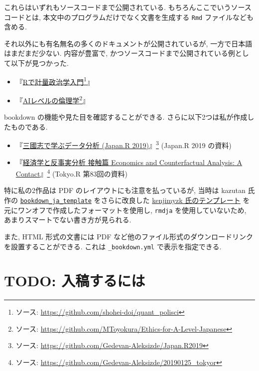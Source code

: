 \documentclass[
  nomag]{bxjsbook}
\providecommand{\tightlist}{%
  \setlength{\itemsep}{0pt}\setlength{\parskip}{0pt}}
\theoremstyle{definition}
\theoremstyle{definition}
\theoremstyle{definition}
\theoremstyle{remark}
\begin{document}
これらはいずれもソースコードまで公開されている.
もちろんここでいうソースコードとは,
本文中のプログラムだけでなく文書を生成する \texttt{Rmd}
ファイルなども含める.

それ以外にも有名無名の多くのドキュメントが公開されているが,
一方で日本語はまだまだ少ない. 内容が豊富で,
かつソースコードまで公開されている例として以下が見つかった.

\begin{itemize}
\tightlist
\item
  『\href{https://shohei-doi.github.io/quant_polisci/}{Rで計量政治学入門}\footnote{ソース:
    \url{https://github.com/shohei-doi/quant_polisci}}』
\item
  『\href{https://mtoyokura.github.io/Ethics-for-A-Level-Japanese/}{AIレベルの倫理学}\footnote{ソース:
    \url{https://github.com/MToyokura/Ethics-for-A-Level-Japanese}}』
\end{itemize}

bookdown の機能や見た目を確認することができる.
さらに以下2つは私が作成したものである.

\begin{itemize}
\tightlist
\item
  『\href{https://gedevan-aleksizde.github.io/Japan.R2019/}{三國志で学ぶデータ分析
  (Japan.R 2019)}』\footnote{ソース:
    \url{https://github.com/Gedevan-Aleksizde/Japan.R2019}} (Japan.R
  2019 の資料)
\item
  『\href{https://gedevan-aleksizde.github.io/20190125_tokyor/}{経済学と反事実分析
  接触篇 Economics and Counterfactual Analysis: A Contact}』\footnote{ソース:
    \url{https://github.com/Gedevan-Aleksizde/20190125_tokyor}} (Tokyo.R
  第83回の資料)
\end{itemize}

特に私の2作品は PDF のレイアウトにも注意を払っているが, 当時は kazutan
氏作の
\href{https://github.com/kazutan/bookdown_ja_template}{\texttt{bookdown\_ja\_template}}
をさらに改良した
\href{https://github.com/kenjimyzk/bookdown_ja_template}{kenjimyzk
氏のテンプレート} を元にワンオフで作成したフォーマットを使用し,
\texttt{rmdja} を使用していないため,
あまりスマートでない書き方が見られる.

また, HTML 形式の文書には PDF
など他のファイル形式のダウンロードリンクを設置することができる. これは
\texttt{\_bookdown.yml} で表示を指定できる.

\hypertarget{todo-ux5165ux7a3fux3059ux308bux306bux306f}{%
\section{TODO:
入稿するには}\label{todo-ux5165ux7a3fux3059ux308bux306bux306f}}
\end{document}
